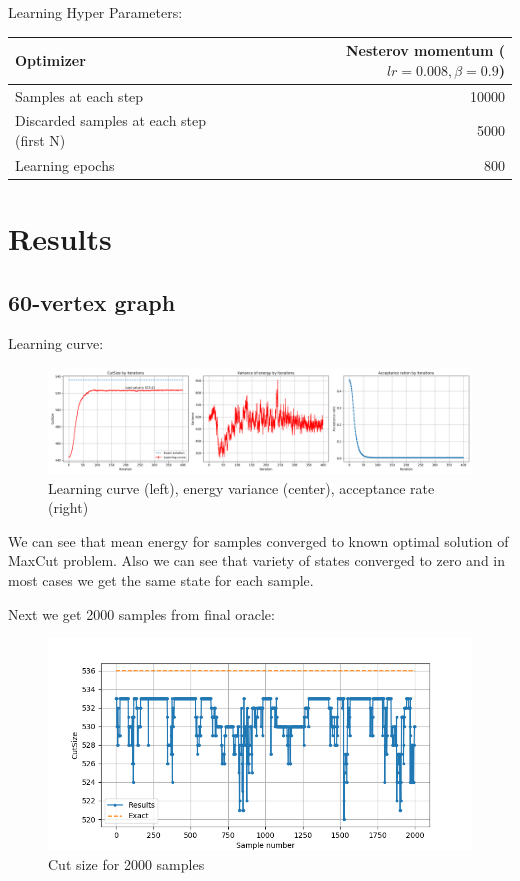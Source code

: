 \documentclass{article}
\begin{document}
Learning Hyper Parameters:
\begin{center}
\begin{tabular}[center]{| l | r |}
\hline
Optimizer & Nesterov momentum ($lr=0.008, \beta = 0.9$) \\ \hline
Samples at each step & 10000 \\ \hline
Discarded samples at each step (first N) & 5000 \\ \hline
Learning epochs & 800 \\
\hline
\end{tabular}
\end{center}

\section{Results}
\subsection{60-vertex graph}
Learning curve:
\begin{figure}
\centering
\includegraphics[scale=0.3]{resultPlot60}
\caption{Learning curve (left), energy variance (center), acceptance rate (right)}
\end{figure}

We can see that mean energy for samples converged to known optimal solution of MaxCut problem. Also we can see that variety of states converged to zero and in most cases we get the same state for each sample.

Next we get 2000 samples from final oracle:
\begin{figure}
\centering
\includegraphics[scale=0.4]{samples60}
\caption{Cut size for 2000 samples}
\end{figure}
\end{document}
